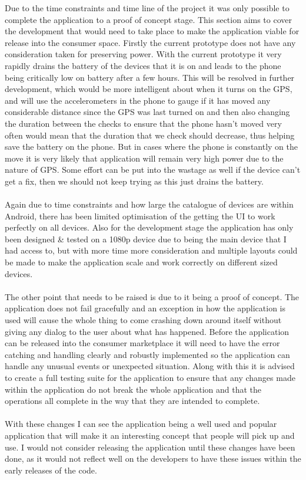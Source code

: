 Due to the time constraints and time line of the project it was only possible to complete the application to a proof of concept stage. This section aims to cover the development that would need to take place to make the application viable for release into the consumer space. Firstly the current prototype does not have any consideration taken for preserving power. With the current prototype it very rapidly drains the battery of the devices that it is on and leads to the phone being critically low on battery after a few hours. This will be resolved in further development, which would be more intelligent about when it turns on the GPS, and will use the accelerometers in the phone to gauge if it has moved any considerable distance since the GPS was last turned on and then also changing the duration between the checks to ensure that the phone hasn't moved very often would mean that the duration that we check should decrease, thus helping save the battery on the phone. But in cases where the phone is constantly on the move it is very likely that application will remain very high power due to the nature of GPS. Some effort can be put into the wastage as well if the device can't get a fix, then we should not keep trying as this just drains the battery.\\
\\
Again due to time constraints and how large the catalogue of devices are within Android, there has been limited optimisation of the getting the UI to work perfectly on all devices. Also for the development stage the application has only been designed \& tested on a 1080p device due to being the main device that I had access to, but with more time more consideration and multiple layouts could be made to make the application scale and work correctly on different sized devices.\\
\\
The other point that needs to be raised is due to it being a proof of concept. The application does not fail gracefully and an exception in how the application is used will cause the whole thing to come crashing down around itself without giving any dialog to the user about what has happened. Before the application can be released into the consumer marketplace it will need to have the error catching and handling clearly and robustly implemented so the application can handle any unusual events or unexpected situation. Along with this it is advised to create a full testing suite for the application to ensure that any changes made within the application do not break the whole application and that the operations all complete in the way that they are intended to complete.\\
\\
With these changes I can see the application being a well used and popular application that will make it an interesting concept that people will pick up and use. I would not consider releasing the application until these changes have been done, as it would not reflect well on the developers to have these issues within the early releases of the code.

